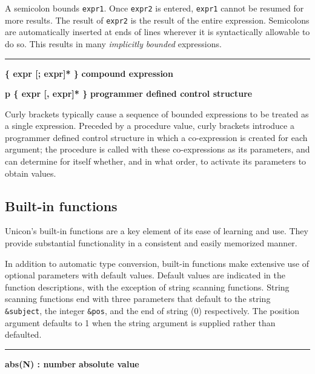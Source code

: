 \noindent
A semicolon bounds \texttt{expr1}. Once \texttt{expr2} is entered,
\texttt{expr1} cannot be resumed for more results. The result of
\texttt{expr2} is the result of the entire expression.
Semicolons are automatically
inserted at ends of lines wherever it is syntactically
allowable to do so. This results in many \textit{implicitly} 
\textit{bounded} expressions.

\bigskip\hrule\vspace{0.1cm}
\noindent
{\bf \{ expr [; expr]* \} } \hfill {\bf compound expression}

\noindent
{\bf p \{ expr [, expr]* \} } \hfill {\bf programmer defined control structure}

\noindent
Curly brackets typically cause a sequence
of bounded expressions to be treated as a single expression. Preceded
by a procedure value, curly brackets introduce a programmer defined
control structure in which a co-expression is created for each
argument; the procedure is called with these co-expressions as its
parameters, and can determine for itself whether, and in what order, to
activate its parameters to obtain values.

\subsection*{Built-in functions}

Unicon's built-in functions
are a key element of its ease of learning and use. They provide
substantial functionality in a consistent and easily memorized manner.

In addition to automatic type conversion, built-in functions make
extensive use of optional parameters with default values. Default
values are indicated in the function descriptions, with the exception
of string scanning functions.
String scanning
functions end with three parameters that
default to the string \texttt{\&subject}, the integer \texttt{\&pos},
and the end of string (0) respectively. The position argument defaults
to 1 when the string argument is supplied rather than defaulted.

\bigskip
\hrule\vspace{0.1cm}
\noindent
{\bf abs(N) : number} \hfill {\bf absolute value}

